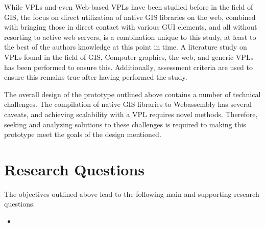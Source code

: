 While VPLs and even Web-based VPLs have been studied before in the field of \ac{GIS}, the focus on direct utilization of native \ac{GIS} libraries on the web, combined with bringing those in direct contact with various \ac{GUI} elements, and all without resorting to active web servers, is a combination unique to this study, at least to the best of the authors knowledge at this point in time. 
A literature study on \ac{VPL}s found in the field of \ac{GIS}, Computer graphics, the web, and generic VPLs has been performed to ensure this.
Additionally, assessment criteria are used to ensure this remains true after having performed the study.

The overall design of the prototype outlined above contains a number of technical challenges.
The compilation of native \ac{GIS} libraries to Webassembly has several caveats, and achieving scalability with a VPL requires novel methods. 
Therefore, seeking and analyzing solutions to these challenges is required to making this prototype meet the goals of the design mentioned. 



\section{Research Questions}
The objectives outlined above lead to the following main and supporting research questions:  
\begin{itemize}[ ]
  \item \myNewMainRQ
\end{itemize}

